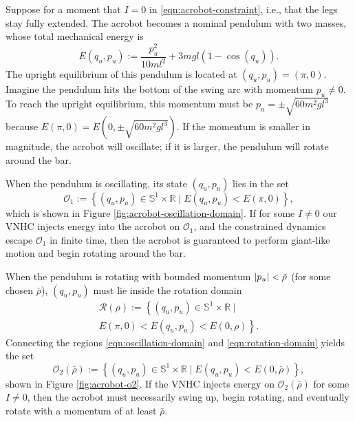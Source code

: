 \documentclass[journal,twoside,web]{ieeecolor}
\DeclarePairedDelimiter{\abs}{\lvert}{\rvert}
\newcommand*{\R}{\mathbb{R}}
\newcommand*{\Sone}{\mathbb{S}^1}
\newcommand*{\SxR}{\Sone \times \R}
\begin{document}
{Suppose for a moment that \(I = 0\) in \eqref{eqn:acrobot-constraint}, i.e.,
that the legs stay fully extended.
The acrobot becomes a nominal pendulum with two masses, whose total mechanical
energy is
\begin{equation}\label{eqn:nominal-energy}
    E(q_u,p_u) := \frac{p_u^2}{10ml^2} + 3mgl(1 - \cos(q_u))
    .
\end{equation}
The upright equilibrium of this pendulum is located at \((q_u,p_u) = (\pi,0)\).
Imagine the pendulum hits the bottom of the swing arc with momentum 
\(p_u \neq 0\). 
To reach the upright equilibrium, this momentum must be
\(p_u = \pm\sqrt{60m^2gl^3}\) because \(E(\pi,0) = E(0,\pm\sqrt{60m^2gl^3})\).
If the momentum is smaller in magnitude, the acrobot will oscillate; 
if it is larger, the pendulum will rotate around the bar.

When the pendulum is oscillating, its state \((q_u,p_u)\) lies in the set
\begin{equation}\label{eqn:oscillation-domain}
    \mathcal{O}_1 := \left\{(q_u,p_u) \in \SxR 
    \mid E(q_u,p_u) < E(\pi,0) \right\}
    ,
\end{equation}
which is shown in Figure \ref{fig:acrobot-oscillation-domain}.
If for some \(I \neq 0\) our VNHC injects energy into the acrobot on 
\(\mathcal{O}_1\), and the constrained dynamics escape
\(\mathcal{O}_1\) in finite time, then the acrobot is guaranteed to perform
giant-like motion and begin rotating around the bar.

When the pendulum is rotating with bounded momentum
\(\abs{p_u} < \bar{\rho}\) (for some chosen \(\bar{\rho}\)),
\((q_u,p_u)\) must lie inside the rotation domain
\begin{multline}\label{eqn:rotation-domain}
    \mathcal{R}(\rho) := \left\{
        (q_u,p_u) \in \SxR \mid\right.
        \\
        \left.E(\pi,0) < E(q_u,p_u) < E(0,\rho)
    \right\}
    .
\end{multline}
Connecting the regions \eqref{eqn:oscillation-domain} and
\eqref{eqn:rotation-domain} yields the set
\begin{equation}\label{eqn:o-rhobar}
    \mathcal{O}_2(\bar{\rho}) := \left\{(q_u,p_u) \in \SxR
        \mid E(q_u,p_u) < E(0,\bar{\rho}) \right\}
    ,
\end{equation}
shown in Figure \ref{fig:acrobot-o2}.
If the VNHC injects energy on \(\mathcal{O}_2(\bar{\rho})\) for some 
\(I \neq 0\), then the acrobot must necessarily swing up, begin rotating, 
and eventually rotate with a momentum of at least \(\bar{\rho}\).

}
\end{document}
